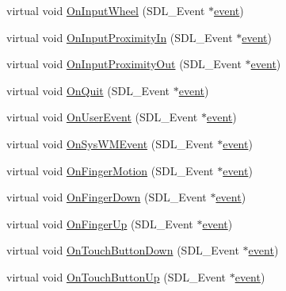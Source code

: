 \begin{DoxyCompactItemize}
\item 
virtual void \hyperlink{class_d_k_event_a1a3cd1e1b55436c7563c814acac8bba9}{On\-Input\-Wheel} (S\-D\-L\-\_\-\-Event $\ast$\hyperlink{class_d_k_event_a3deebb932ed734363c4ece87971bc45f}{event})
\item 
virtual void \hyperlink{class_d_k_event_a7eb00a25ecab3ff8d07d50503cb64db5}{On\-Input\-Proximity\-In} (S\-D\-L\-\_\-\-Event $\ast$\hyperlink{class_d_k_event_a3deebb932ed734363c4ece87971bc45f}{event})
\item 
virtual void \hyperlink{class_d_k_event_ab6bddd134e4b99316db4c7805dbbd829}{On\-Input\-Proximity\-Out} (S\-D\-L\-\_\-\-Event $\ast$\hyperlink{class_d_k_event_a3deebb932ed734363c4ece87971bc45f}{event})
\item 
virtual void \hyperlink{class_d_k_event_a03ec87479d8f2d25a8499b19f35b78f2}{On\-Quit} (S\-D\-L\-\_\-\-Event $\ast$\hyperlink{class_d_k_event_a3deebb932ed734363c4ece87971bc45f}{event})
\item 
virtual void \hyperlink{class_d_k_event_a1d79cd852928965a7b1c49d594443691}{On\-User\-Event} (S\-D\-L\-\_\-\-Event $\ast$\hyperlink{class_d_k_event_a3deebb932ed734363c4ece87971bc45f}{event})
\item 
virtual void \hyperlink{class_d_k_event_a549f8299a11e77a332efc707442082ed}{On\-Sys\-W\-M\-Event} (S\-D\-L\-\_\-\-Event $\ast$\hyperlink{class_d_k_event_a3deebb932ed734363c4ece87971bc45f}{event})
\item 
virtual void \hyperlink{class_d_k_event_a036018589389a7e37ed61580b6d66ffd}{On\-Finger\-Motion} (S\-D\-L\-\_\-\-Event $\ast$\hyperlink{class_d_k_event_a3deebb932ed734363c4ece87971bc45f}{event})
\item 
virtual void \hyperlink{class_d_k_event_a89602c1b81a1570677db8e5f49a95b39}{On\-Finger\-Down} (S\-D\-L\-\_\-\-Event $\ast$\hyperlink{class_d_k_event_a3deebb932ed734363c4ece87971bc45f}{event})
\item 
virtual void \hyperlink{class_d_k_event_a25662530ea939c67bcf18d792a5df1e2}{On\-Finger\-Up} (S\-D\-L\-\_\-\-Event $\ast$\hyperlink{class_d_k_event_a3deebb932ed734363c4ece87971bc45f}{event})
\item 
virtual void \hyperlink{class_d_k_event_ac547626b60c3af60c7c1cd9482c83cbc}{On\-Touch\-Button\-Down} (S\-D\-L\-\_\-\-Event $\ast$\hyperlink{class_d_k_event_a3deebb932ed734363c4ece87971bc45f}{event})
\item 
virtual void \hyperlink{class_d_k_event_a8efc9bdf08beee32ba09e5dd1ec2f190}{On\-Touch\-Button\-Up} (S\-D\-L\-\_\-\-Event $\ast$\hyperlink{class_d_k_event_a3deebb932ed734363c4ece87971bc45f}{event})

\end{DoxyCompactItemize}

